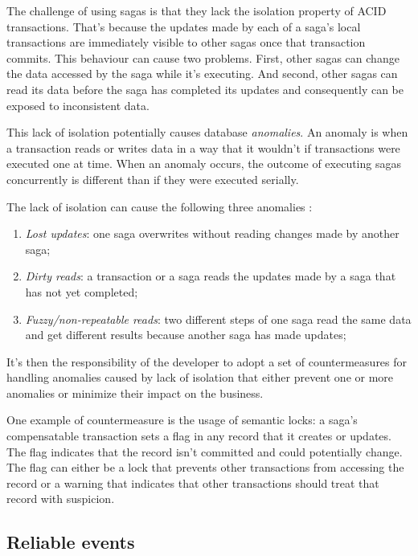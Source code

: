 \documentclass[conference]{IEEEtran}
\begin{document}
The challenge of using sagas is that they lack the isolation property of ACID transactions. That’s because the updates made by each of a saga’s local transactions are immediately visible to other sagas once that transaction commits. This behaviour can cause two problems. First, other sagas can change the data accessed by the saga while it’s executing. And second, other sagas can read its data before the saga has completed its updates and consequently can be exposed to inconsistent data.

This lack of isolation potentially causes database \textit{anomalies}. An anomaly is when a transaction reads or writes data in a way that it wouldn’t if transactions were executed one at time. When an anomaly occurs, the outcome of executing sagas concurrently is different than if they were executed serially.

The lack of isolation can cause the following three anomalies \cite{microservices-patterns-anomalies}:

\begin{enumerate}
  \item \textit{Lost updates}: one saga overwrites without reading changes made by another saga;
  \item \textit{Dirty reads}: a transaction or a saga reads the updates made by a saga that has not yet completed;
  \item \textit{Fuzzy/non-repeatable reads}: two different steps of one saga read the same data and get different results because another saga has made updates;
\end{enumerate}

It’s then the responsibility of the developer to adopt a set of countermeasures for handling anomalies caused by lack of isolation that either prevent one or more anomalies or minimize their impact on the business. \cite{semantic-acid}

One example of countermeasure is the usage of semantic locks: a saga’s compensatable transaction sets a flag in any record that it creates or updates. The flag indicates that the record isn’t committed and could potentially change. The flag can either be a lock that prevents other transactions from accessing the record or a warning that indicates that other transactions should treat that record with suspicion.

\subsection{Reliable events}
\end{document}
